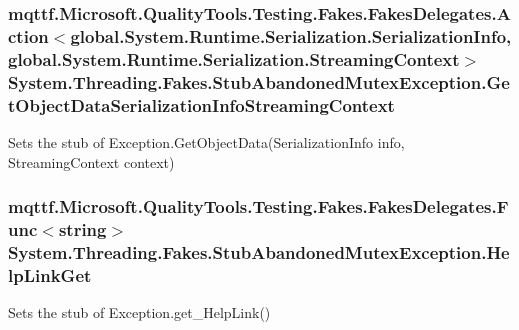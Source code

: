 \hypertarget{class_system_1_1_threading_1_1_fakes_1_1_stub_abandoned_mutex_exception_a926b2241fedd4e36b4700aab6fbd97e7}{
\subsubsection[{Get\-Object\-Data\-Serialization\-Info\-Streaming\-Context}]{\setlength{\rightskip}{0pt plus 5cm}mqttf.\-Microsoft.\-Quality\-Tools.\-Testing.\-Fakes.\-Fakes\-Delegates.\-Action$<$global.\-System.\-Runtime.\-Serialization.\-Serialization\-Info, global.\-System.\-Runtime.\-Serialization.\-Streaming\-Context$>$ System.\-Threading.\-Fakes.\-Stub\-Abandoned\-Mutex\-Exception.\-Get\-Object\-Data\-Serialization\-Info\-Streaming\-Context}}\label{class_system_1_1_threading_1_1_fakes_1_1_stub_abandoned_mutex_exception_a926b2241fedd4e36b4700aab6fbd97e7}


Sets the stub of Exception.\-Get\-Object\-Data(\-Serialization\-Info info, Streaming\-Context context)

\hypertarget{class_system_1_1_threading_1_1_fakes_1_1_stub_abandoned_mutex_exception_a4d5700f5f0bd0c9c688d8d6de566324b}{
\subsubsection[{Help\-Link\-Get}]{\setlength{\rightskip}{0pt plus 5cm}mqttf.\-Microsoft.\-Quality\-Tools.\-Testing.\-Fakes.\-Fakes\-Delegates.\-Func$<$string$>$ System.\-Threading.\-Fakes.\-Stub\-Abandoned\-Mutex\-Exception.\-Help\-Link\-Get}}\label{class_system_1_1_threading_1_1_fakes_1_1_stub_abandoned_mutex_exception_a4d5700f5f0bd0c9c688d8d6de566324b}


Sets the stub of Exception.\-get\-\_\-\-Help\-Link()

